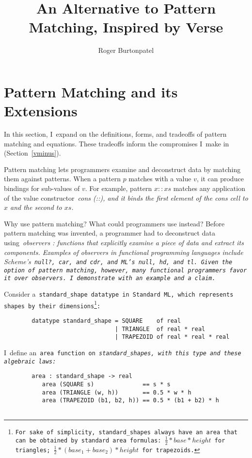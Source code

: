 \documentclass[manuscript,screen 12pt, nonacm]{acmart}
\title{An Alternative to Pattern Matching, Inspired by Verse}
\author{Roger Burtonpatel}
\affiliation{%
  \institution{Tufts University}
  \streetaddress{419 Boston Ave}
  \city{Medford}
  \state{Massachusetts}
  \country{USA}
  \postcode{02155}
}
\begin{document}
\section{Pattern Matching and its Extensions}
\label{pmandextensions}

In this section, I~expand on the definitions, forms, and tradeoffs of pattern
matching and equations. These tradeoffs inform the compromises I~make in
\VMinus (Section~\ref{vminus}).



Pattern matching lets programmers examine and deconstruct data by matching them
against patterns. When a pattern $p$ matches with a value $v$, it can produce
bindings for sub-values of $v$. For example, pattern $x::xs$ matches any 
application of the value constructor~\it{cons} (\it{::}), and it binds the first 
element of the cons cell to $x$ and the second to $xs$. 

Why use pattern matching? What could programmers use instead? Before pattern
matching was invented, a programmer had to deconstruct data using~\it{observers}
\citep{liskov:abstraction}: functions that explicitly examine a piece of data
and extract its components. Examples of observers in functional programming
languages include Scheme's~\tt{null?},~\tt{car}, and~\tt{cdr}, and ML's
\tt{null},~\tt{hd}, and~\tt{tl}. Given the option of pattern matching, however,
many functional programmers favor it over observers. I~demonstrate with an
example and a claim. 

Consider a~\tt{standard\_shape} datatype in Standard ML, which represents shapes
by their dimensions\footnote{For sake of simplicity,~\tt{standard\_shape}s
always have an area that can be obtained by standard area formulas: $\frac{1}{2}
* base * height$ for triangles; $\frac{1}{2} * (base_{1} + base_{2}) * height$
for trapezoids.}: 

\medskip 
\begin{minipage}[t]{\textwidth}
    \begin{verbatim}
        datatype standard_shape = SQUARE    of real 
                                | TRIANGLE  of real * real 
                                | TRAPEZOID of real * real * real
\end{verbatim}
\end{minipage}
\medskip 

I~define an~\tt{area} function on~\it{standard\_shape}s, with this type and these
algebraic laws: 

\medskip 
\begin{minipage}[t]{\textwidth}
    \begin{verbatim}
        area : standard_shape -> real 
           area (SQUARE s)              == s * s 
           area (TRIANGLE (w, h))       == 0.5 * w * h
           area (TRAPEZOID (b1, b2, h)) == 0.5 * (b1 + b2) * h
        
\end{verbatim}
\end{minipage}
\medskip 
\end{document}
